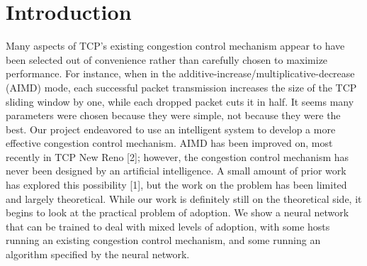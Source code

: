 \documentclass[conference]{IEEEtran}
\begin{document}
%
\IEEEpeerreviewmaketitle



\section{Introduction}
Many aspects of TCP's existing congestion control mechanism appear to have been
selected out of convenience rather than carefully chosen to maximize
performance. For instance, when in the additive-increase/multiplicative-decrease
(AIMD) mode, each successful packet transmission increases the size of the TCP
sliding window by one, while each dropped packet cuts it in half. It seems many
parameters were chosen because they were simple, not because they were the best.
Our project endeavored to use an intelligent system to develop a more effective
congestion control mechanism. AIMD has been improved on, most recently in TCP
New Reno [2]; however, the congestion control mechanism has never been
designed by an artificial intelligence. A small amount of prior work has
explored this possibility [1], but the work on the problem has been limited and
largely theoretical. While our work is definitely still on the theoretical side,
it begins to look at the practical problem of adoption. We show a neural
network that can be trained to deal with mixed levels of adoption, with some
hosts running an existing congestion control mechanism, and some running an
algorithm specified by the neural network.
\end{document}
